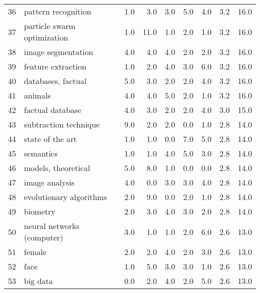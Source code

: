 \begin{tabular}{llrrrrrrr}
36 &                      pattern recognition &   1.0 &   3.0 &   3.0 &   5.0 &   4.0 &   3.2 &   16.0 \\
37 &              particle swarm optimization &   1.0 &  11.0 &   1.0 &   2.0 &   1.0 &   3.2 &   16.0 \\
38 &                       image segmentation &   4.0 &   4.0 &   4.0 &   2.0 &   2.0 &   3.2 &   16.0 \\
39 &                       feature extraction &   1.0 &   2.0 &   4.0 &   3.0 &   6.0 &   3.2 &   16.0 \\
40 &                       databases, factual &   5.0 &   3.0 &   2.0 &   2.0 &   4.0 &   3.2 &   16.0 \\
41 &                                  animals &   4.0 &   4.0 &   5.0 &   2.0 &   1.0 &   3.2 &   16.0 \\
42 &                         factual database &   4.0 &   3.0 &   2.0 &   2.0 &   4.0 &   3.0 &   15.0 \\
43 &                    subtraction technique &   9.0 &   2.0 &   2.0 &   0.0 &   1.0 &   2.8 &   14.0 \\
44 &                         state of the art &   1.0 &   1.0 &   0.0 &   7.0 &   5.0 &   2.8 &   14.0 \\
45 &                                semantics &   1.0 &   1.0 &   4.0 &   5.0 &   3.0 &   2.8 &   14.0 \\
46 &                      models, theoretical &   5.0 &   8.0 &   1.0 &   0.0 &   0.0 &   2.8 &   14.0 \\
47 &                           image analysis &   4.0 &   0.0 &   3.0 &   3.0 &   4.0 &   2.8 &   14.0 \\
48 &                  evolutionary algorithms &   2.0 &   9.0 &   0.0 &   2.0 &   1.0 &   2.8 &   14.0 \\
49 &                                 biometry &   2.0 &   3.0 &   4.0 &   3.0 &   2.0 &   2.8 &   14.0 \\
50 &               neural networks (computer) &   3.0 &   1.0 &   1.0 &   2.0 &   6.0 &   2.6 &   13.0 \\
51 &                                   female &   2.0 &   2.0 &   4.0 &   2.0 &   3.0 &   2.6 &   13.0 \\
52 &                                     face &   1.0 &   5.0 &   3.0 &   3.0 &   1.0 &   2.6 &   13.0 \\
53 &                                 big data &   0.0 &   2.0 &   4.0 &   2.0 &   5.0 &   2.6 &   13.0 \\

\end{tabular}
